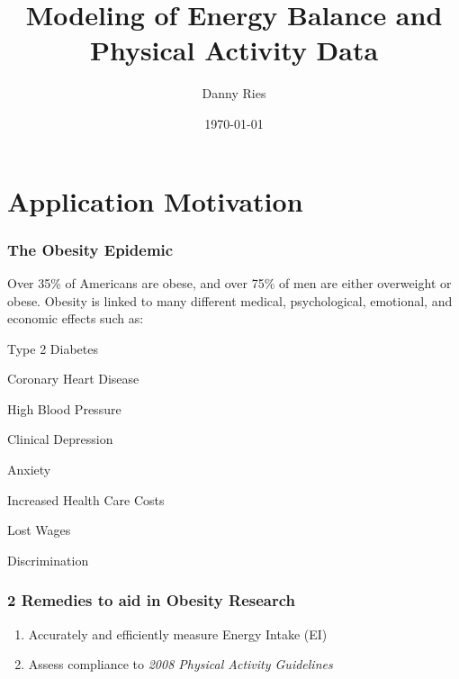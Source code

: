 \documentclass[handout]{beamer}\usepackage[]{graphicx}\usepackage[]{color}
\title{Modeling of Energy Balance and Physical Activity Data}
\author[Danny Ries]{Danny Ries}
\institute[Iowa State]{Iowa State University}
\date{\today}
\begin{document}







\frame{\maketitle}

\section{Application Motivation}
\begin{frame}
\frametitle{The Obesity Epidemic}

Over 35\% of Americans are obese, and over  75\% of men are either overweight or obese. Obesity is linked to many different medical, psychological, emotional, and economic effects such as:
\begin{itemize}
\begin{multicols}{2}
\item
Type 2 Diabetes
\item
Coronary Heart Disease
\item
High Blood Pressure
\item 
Clinical Depression
\columnbreak
\item
Anxiety
\item 
Increased Health Care Costs
\item
Lost Wages
\item
Discrimination
\end{multicols}
\end{itemize}

\end{frame}






\begin{frame}
\frametitle{2 Remedies to aid in Obesity Research}
\begin{enumerate}
\item
Accurately and efficiently measure Energy Intake (EI)

\vspace{0.2cm}

\item
Assess compliance to \emph{2008 Physical Activity Guidelines}
\end{enumerate}



\end{frame}
\end{document}
